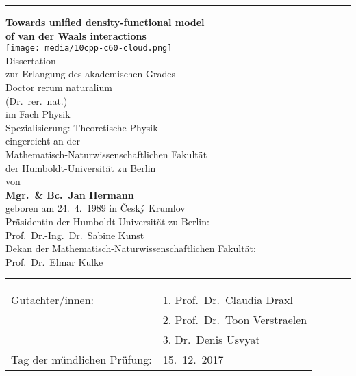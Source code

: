 







\begin{titlepage}
\sffamily
\hrule
\begin{center}
\vfill{\Large\bfseries Towards unified density-functional model\\of van der Waals interactions}\\
\vfill\texttt{[image: media/10cpp-c60-cloud.png]}\\
\vfill{\large Dissertation}\\[1em]
zur Erlangung des akademischen Grades \\[0.5em]
Doctor rerum naturalium \\
(Dr.\ rer.\ nat.) \\[0.5em]
im Fach Physik \\
{\small Spezialisierung: Theoretische Physik} \\[1em]
eingereicht an der \\
Mathematisch-Naturwissenschaftlichen Fakultät \\
der Humboldt-Universität zu Berlin \\[1em]
von \\[0.5em]
{\bfseries Mgr.\ \& Bc.\ Jan Hermann} \\[0.5em]
geboren am 24.\ 4.\ 1989 in Český Krumlov \\[2em]
{\small Präsidentin der Humboldt-Universität zu Berlin: \\
Prof.\ Dr.-Ing.\ Dr.\ Sabine Kunst \\[0.5em]
Dekan der Mathematisch-Naturwissenschaftlichen Fakultät: \\
Prof.\ Dr.\ Elmar Kulke}
\end{center}
\vfill
\hrule
\vspace{1cm}
\begin{tabular}{p{6cm}l}
Gutachter/innen: & 1. Prof.\ Dr.\ Claudia Draxl \\
& 2. Prof.\ Dr.\ Toon Verstraelen \\
& 3. Dr.\ Denis Usvyat \\[1em]
Tag der mündlichen Prüfung: & 15.\ 12.\ 2017
\end{tabular}
\end{titlepage}
\thispagestyle{empty}

\restoregeometry%

